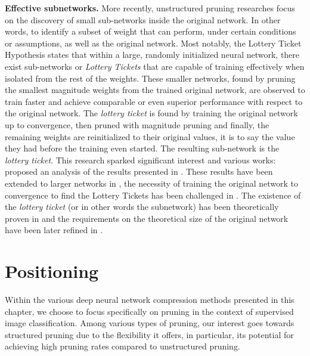 \noindent\textbf{Effective subnetworks.} More recently, unstructured pruning
researches focus on the discovery of small sub-networks inside the original
network. In other words, to identify a subset of weight that can perform, under
certain conditions or assumptions, as well as the original network. Most
notably, the Lottery Ticket Hypothesis \cite{DBLP:conf/iclr/FrankleC19} states
that within a large, randomly initialized neural network, there exist
sub-networks or \emph{Lottery Tickets} that are capable of training effectively
when isolated from the rest of the weights. These smaller networks, found by
pruning the smallest magnitude weights from the trained original network, are
observed to train faster and achieve comparable or even superior performance
with respect to the original network. The \emph{lottery ticket} is found by
training the original network up to convergence, then pruned with magnitude
pruning and finally, the remaining weights are reinitialized to their original
values, it is to say the value they had before the training even started. The
resulting sub-network is the \emph{lottery ticket}. This research sparked
significant interest and various works: \cite{DBLP:conf/nips/ZhouLLY19} proposed
an analysis of the results presented in \cite{DBLP:conf/iclr/FrankleC19}. These
results \cite{DBLP:conf/iclr/FrankleC19} have been extended to larger networks
in \cite{DBLP:journals/corr/abs-1903-01611}, the necessity of training the
original network to convergence to find the Lottery Tickets has been challenged
in \cite{DBLP:conf/iclr/LiuSZHD19}. The existence of the \emph{lottery ticket}
(or in other words the subnetwork) has been theoretically proven in
\cite{DBLP:conf/icml/MalachYSS20} and the requirements on the theoretical size
of the original network have been later refined in
\cite{DBLP:conf/nips/PensiaRNVP20,DBLP:conf/nips/OrseauHR20}.\\

\section{Positioning}

Within the various deep neural network compression methods presented in this
chapter, we choose to focus specifically on pruning in the context of supervised
image classification. Among various types of pruning, our interest goes towards
structured pruning due to the flexibility it offers, in particular, its
potential for achieving high pruning rates compared to unstructured pruning.\\

